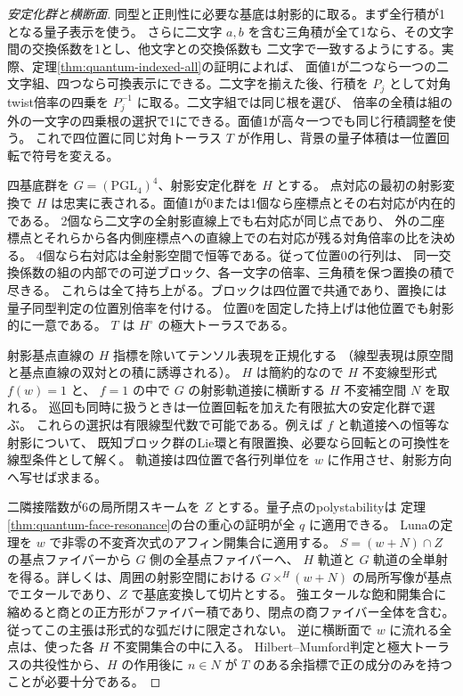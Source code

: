 \begin{proof}[安定化群と横断面]
同型と正則性に必要な基底は射影的に取る。まず全行積が1となる量子表示を使う。
さらに二文字 $a,b$ を含む三角積が全て1なら、その文字間の交換係数を1とし、他文字との交換係数も
二文字で一致するようにする。実際、定理\ref{thm:quantum-indexed-all}の証明によれば、
面値1が二つなら一つの二文字組、四つなら可換表示にできる。二文字を揃えた後、行積を
$P_j$ として対角twist倍率の四乗を $P_j^{-1}$ に取る。二文字組では同じ根を選び、
倍率の全積は組の外の一文字の四乗根の選択で1にできる。面値1が高々一つでも同じ行積調整を使う。
これで四位置に同じ対角トーラス $T$ が作用し、背景の量子体積は一位置回転で符号を変える。

四基底群を $G=(\mathrm{PGL}_4)^4$、射影安定化群を $H$ とする。
点対応の最初の射影変換で $H$ は忠実に表される。面値1が0または1個なら座標点とその右対応が内在的である。
2個なら二文字の全射影直線上でも右対応が同じ点であり、
外の二座標点とそれらから各内側座標点への直線上での右対応が残る対角倍率の比を決める。
4個なら右対応は全射影空間で恒等である。従って位置0の行列は、
同一交換係数の組の内部での可逆ブロック、各一文字の倍率、三角積を保つ置換の積で尽きる。
これらは全て持ち上がる。ブロックは四位置で共通であり、置換には量子同型判定の位置別倍率を付ける。
位置0を固定した持上げは他位置でも射影的に一意である。
$T$ は $H^\circ$ の極大トーラスである。

射影基点直線の $H$ 指標を除いてテンソル表現を正規化する
（線型表現は原空間と基点直線の双対との積に誘導される）。
$H$ は簡約的なので $H$ 不変線型形式 $f(w)=1$ と、
$f=1$ の中で $G$ の射影軌道接に横断する $H$ 不変補空間 $N$ を取れる。
巡回も同時に扱うときは一位置回転を加えた有限拡大の安定化群で選ぶ。
これらの選択は有限線型代数で可能である。例えば $f$ と軌道接への恒等な射影について、
既知ブロック群のLie環と有限置換、必要なら回転との可換性を線型条件として解く。
軌道接は四位置で各行列単位を $w$ に作用させ、射影方向へ写せば求まる。

二隣接階数が6の局所閉スキームを $Z$ とする。量子点のpolystabilityは
定理\ref{thm:quantum-face-resonance}の台の重心の証明が全 $q$ に適用できる。
Lunaの定理を $w$ で非零の不変斉次式のアフィン開集合に適用する。
$S=(w+N)\cap Z$ の基点ファイバーから $G$ 側の全基点ファイバーへ、
$H$ 軌道と $G$ 軌道の全単射を得る。詳しくは、周囲の射影空間における
$G\mathbin{\times}^H(w+N)$ の局所写像が基点でエタールであり、$Z$ で基底変換して切片とする。
強エタールな飽和開集合に縮めると商との正方形がファイバー積であり、閉点の商ファイバー全体を含む。
従ってこの主張は形式的な弧だけに限定されない。
逆に横断面で $w$ に流れる全点は、使った各 $H$ 不変開集合の中に入る。
Hilbert--Mumford判定と極大トーラスの共役性から、$H$ の作用後に
$n\in N$ が $T$ のある余指標で正の成分のみを持つことが必要十分である。
\end{proof}

